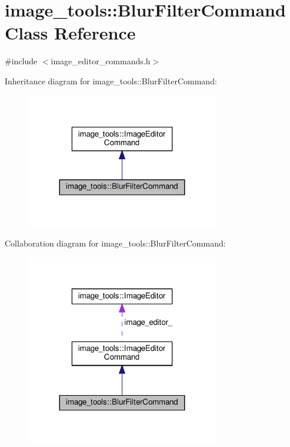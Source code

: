 \hypertarget{classimage__tools_1_1BlurFilterCommand}{}\section{image\+\_\+tools\+:\+:Blur\+Filter\+Command Class Reference}
\label{classimage__tools_1_1BlurFilterCommand}


{\ttfamily \#include $<$image\+\_\+editor\+\_\+commands.\+h$>$}



Inheritance diagram for image\+\_\+tools\+:\+:Blur\+Filter\+Command\+:
\nopagebreak
\begin{figure}[H]
\begin{center}
\leavevmode
\includegraphics[width=239pt]{classimage__tools_1_1BlurFilterCommand__inherit__graph}
\end{center}
\end{figure}


Collaboration diagram for image\+\_\+tools\+:\+:Blur\+Filter\+Command\+:
\nopagebreak
\begin{figure}[H]
\begin{center}
\leavevmode
\includegraphics[width=239pt]{classimage__tools_1_1BlurFilterCommand__coll__graph}
\end{center}
\end{figure}
